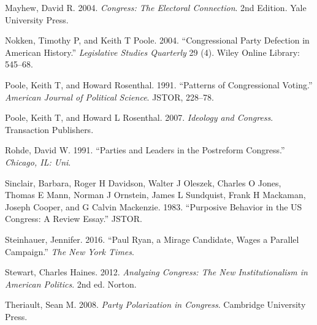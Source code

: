 \documentclass[12pt,twoside]{reedthesis}
\begin{document}
  Mayhew, David R. 2004. \emph{Congress: The Electoral Connection}. 2nd
  Edition. Yale University Press.
  
  Nokken, Timothy P, and Keith T Poole. 2004. ``Congressional Party
  Defection in American History.'' \emph{Legislative Studies Quarterly} 29
  (4). Wiley Online Library: 545--68.
  
  Poole, Keith T, and Howard Rosenthal. 1991. ``Patterns of Congressional
  Voting.'' \emph{American Journal of Political Science}. JSTOR, 228--78.
  
  Poole, Keith T, and Howard L Rosenthal. 2007. \emph{Ideology and
  Congress}. Transaction Publishers.
  
  Rohde, David W. 1991. ``Parties and Leaders in the Postreform
  Congress.'' \emph{Chicago, IL: Uni}.
  
  Sinclair, Barbara, Roger H Davidson, Walter J Oleszek, Charles O Jones,
  Thomas E Mann, Norman J Ornstein, James L Sundquist, Frank H Mackaman,
  Joseph Cooper, and G Calvin Mackenzie. 1983. ``Purposive Behavior in the
  US Congress: A Review Essay.'' JSTOR.
  
  Steinhauer, Jennifer. 2016. ``Paul Ryan, a Mirage Candidate, Wages a
  Parallel Campaign.'' \emph{The New York Times}.
  
  Stewart, Charles Haines. 2012. \emph{Analyzing Congress: The New
  Institutionalism in American Politics}. 2nd ed. Norton.
  
  Theriault, Sean M. 2008. \emph{Party Polarization in Congress}.
  Cambridge University Press.


\end{document}

